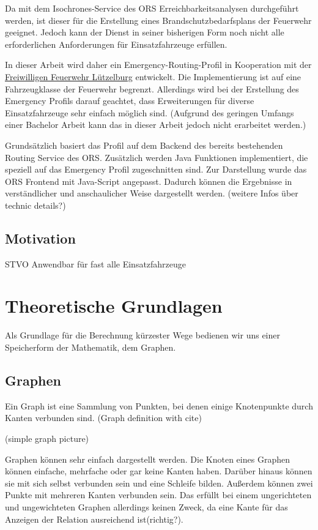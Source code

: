 \documentclass[10pt,a4paper]{report}
\begin{document}
Da mit dem Isochrones-Service des ORS Erreichbarkeitsanalysen durchgeführt werden, ist dieser für die Erstellung eines Brandschutzbedarfsplans der Feuerwehr geeignet. Jedoch kann der Dienst in seiner bisherigen Form noch nicht alle erforderlichen Anforderungen für Einsatzfahrzeuge erfüllen.

In dieser Arbeit wird daher ein Emergency-Routing-Profil in Kooperation mit der \href{https://www.feuerwehr-luetzelburg.de}{Freiwilligen Feuerwehr Lützelburg} entwickelt. Die Implementierung ist auf eine Fahrzeugklasse der Feuerwehr begrenzt. Allerdings wird bei der Erstellung des Emergency Profils darauf geachtet, dass Erweiterungen für diverse Einsatzfahrzeuge sehr einfach möglich sind. (Aufgrund des geringen Umfangs einer Bachelor Arbeit kann das in dieser Arbeit jedoch nicht erarbeitet werden.)

Grundsätzlich basiert das Profil auf dem Backend des bereits bestehenden Routing Service des ORS. Zusätzlich werden Java Funktionen implementiert, die speziell auf das Emergency Profil zugeschnitten sind. Zur Darstellung wurde das ORS Frontend mit Java-Script angepasst. Dadurch können die Ergebnisse in verständlicher und anschaulicher Weise dargestellt werden.
(weitere Infos über technic details?)

\subsection{Motivation}

STVO
Anwendbar für fast alle Einsatzfahrzeuge 

\section{Theoretische Grundlagen}

Als Grundlage für die Berechnung kürzester Wege bedienen wir uns einer Speicherform der Mathematik, dem Graphen.

\subsection{Graphen}

Ein Graph ist eine Sammlung von Punkten, bei denen einige Knotenpunkte durch Kanten verbunden sind. 
(Graph definition with cite)

(simple graph picture)

Graphen können sehr einfach dargestellt werden. Die Knoten eines Graphen können einfache, mehrfache oder gar keine Kanten haben. Darüber hinaus können sie mit sich selbst verbunden sein und eine Schleife bilden. Außerdem können zwei Punkte mit mehreren Kanten verbunden sein. Das erfüllt bei einem ungerichteten und ungewichteten Graphen allerdings keinen Zweck, da eine Kante für das Anzeigen der Relation ausreichend ist(richtig?).
\end{document}
